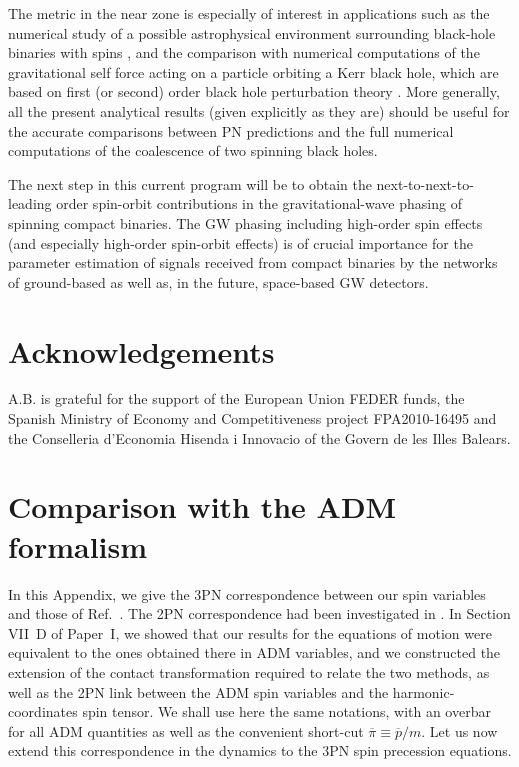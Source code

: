 \documentclass[
superscriptaddress,
preprint,
prd,tightenlines,showpacs,nofootinbib,
eqsecnum,
amsfonts,amsmath,amssymb]{revtex4-1}
\newcommand{\ov}[1]{\overline{#1}}
\begin{document}
The metric in the near zone is especially of interest in applications
such as the numerical study of a possible astrophysical environment
surrounding black-hole binaries with spins \cite{GNYC12}, and the
comparison with numerical computations of the gravitational self force
acting on a particle orbiting a Kerr black hole, which are based on
first (or second) order black hole perturbation theory
\cite{BBL12,FLS12}. More generally, all the present analytical
results (given explicitly as they are) should be useful for the
accurate comparisons between PN predictions and the full numerical
computations of the coalescence of two spinning black holes.

The next step in this current program will be to obtain the
next-to-next-to-leading order spin-orbit contributions in the
gravitational-wave phasing of spinning compact binaries. The GW
phasing including high-order spin effects (and especially high-order
spin-orbit effects) is of crucial importance for the parameter
estimation of signals received from compact binaries by the networks
of ground-based as well as, in the future, space-based GW detectors.

\section*{Acknowledgements}

A.B. is grateful for the support of the European Union FEDER
funds, the Spanish Ministry of Economy and Competitiveness project
FPA2010-16495 and the Conselleria d'Economia Hisenda i Innovacio of
the Govern de les Illes Balears.


%
%
\appendix

%
%


\section{Comparison with the ADM formalism}
\label{app:CompADM}

In this Appendix, we give the 3PN correspondence between our spin
variables and those of Ref.~\cite{Hartung2011}. The 2PN correspondence
had been investigated in \cite{Damour2008a}. In Section VII~D of
Paper~I, we showed that our results for the equations of motion were
equivalent to the ones obtained there in ADM variables, and we
constructed the extension of the contact transformation required to
relate the two methods, as well as the 2PN link between the ADM spin
variables and the harmonic-coordinates spin tensor. We shall use here
the same notations, with an overbar for all ADM quantities as well as
the convenient short-cut $\ov{\pi}\equiv \ov{p}/m$. Let us now extend
this correspondence in the dynamics to the 3PN spin precession
equations.
\end{document}
